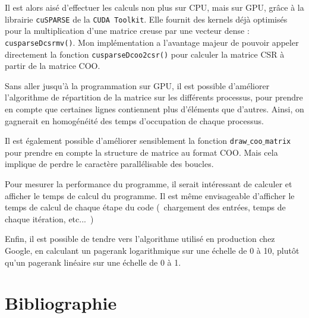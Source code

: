 \documentclass[a4paper,12pt]{article}
\begin{document}
Il est alors aisé d'effectuer les calculs non plus sur CPU, mais sur GPU, grâce à la librairie \texttt{cuSPARSE} de la \texttt{CUDA Toolkit}. Elle fournit des kernels déjà optimisés pour la multiplication d'une matrice creuse par une vecteur dense : \texttt{cusparseDcsrmv()}. Mon implémentation a l'avantage majeur de pouvoir appeler directement la fonction \texttt{cusparseDcoo2csr()} pour calculer la matrice CSR à partir de la matrice COO.

\bigskip

Sans aller jusqu'à la programmation sur GPU, il est possible d'améliorer l'algorithme de répartition de la matrice sur les différents processus, pour prendre en compte que certaines lignes contiennent plus d'éléments que d'autres. Ainsi, on gagnerait en homogénéité des temps d'occupation de chaque processus.

\bigskip

Il est également possible d'améliorer sensiblement la fonction \texttt{draw$\_$coo$\_$matrix} pour prendre en compte la structure de matrice au format COO. Mais cela implique de perdre le caractère parallélisable des boucles.

\bigskip

Pour mesurer la performance du programme, il serait intéressant de calculer et afficher le temps de calcul du programme. Il est même envisageable d'afficher le temps de calcul de chaque étape du code (~chargement des entrées, temps de chaque itération, etc...~)

\bigskip

Enfin, il est possible de tendre vers l'algorithme utilisé en production chez Google, en calculant un pagerank logarithmique sur une échelle de 0 à 10, plutôt qu'un pagerank linéaire sur une échelle de 0 à 1.

\newpage

\section{Bibliographie}

\bigskip
\end{document}
